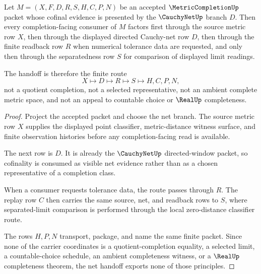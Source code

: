 \begin{theorem}
\label{thm:metric-completion-cauchy-net-handoff}
Let $M=(X,F,D,R,S,H,C,P,N)$ be an accepted $\MetricCompletionUp$ packet whose cofinal evidence is presented by the $\CauchyNetUp$ branch $D$. Then every completion-facing consumer of $M$ factors first through the source metric row $X$, then through the displayed directed Cauchy-net row $D$, then through the finite readback row $R$ when numerical tolerance data are requested, and only then through the separatedness row $S$ for comparison of displayed limit readings.

The handoff is therefore the finite route
$$
X\longmapsto D\longmapsto R\longmapsto S\longmapsto H,C,P,N ,
$$
not a quotient completion, not a selected representative, not an ambient complete metric space, and not an appeal to countable choice or $\RealUp$ completeness.
\end{theorem}
\begin{proof}
Project the accepted packet and choose the net branch. The source metric row $X$ supplies the displayed point classifier, metric-distance witness surface, and finite observation histories before any completion-facing read is available.

The next row is $D$. It is already the $\CauchyNetUp$ directed-window packet, so cofinality is consumed as visible net evidence rather than as a chosen representative of a completion class.

When a consumer requests tolerance data, the route passes through $R$. The replay row $C$ then carries the same source, net, and readback rows to $S$, where separated-limit comparison is performed through the local zero-distance classifier route.

The rows $H,P,N$ transport, package, and name the same finite packet. Since none of the carrier coordinates is a quotient-completion equality, a selected limit, a countable-choice schedule, an ambient completeness witness, or a $\RealUp$ completeness theorem, the net handoff exports none of those principles.
\end{proof}

